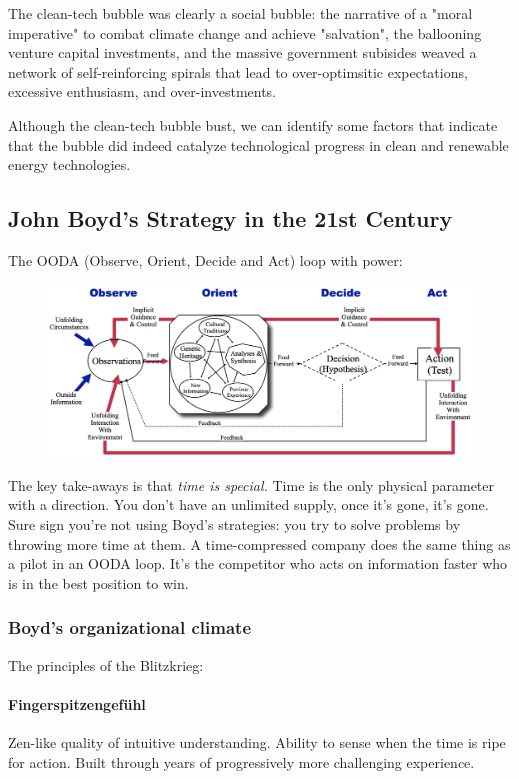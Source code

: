 \documentclass[a4paper]{extarticle}
\begin{document}
The clean-tech bubble was clearly a social bubble: the narrative of a "moral imperative" to combat climate change and achieve "salvation", the ballooning venture capital investments, and the massive government subisides weaved a network of self-reinforcing spirals that lead to over-optimsitic expectations, excessive enthusiasm, and over-investments.

Although the clean-tech bubble bust, we can identify some factors that indicate that the bubble did indeed catalyze technological progress in clean and renewable energy technologies.

\subsection{John Boyd's Strategy in the 21st Century}

The OODA (Observe, Orient, Decide and Act) loop with power:

\begin{figure}[H]
    \includegraphics[width=15cm]{../images/EnpRisk_Fig13-3}
    \centering
\end{figure}

The key take-aways is that \textit{time is special.} Time is the only physical parameter with a direction. You don't have an unlimited supply, once it's gone, it's gone. Sure sign you're not using Boyd's strategies: you try to solve problems by throwing more time at them. A time-compressed company does the same thing as a pilot in an OODA loop. It's the competitor who acts on information faster who is in the best position to win.

\subsubsection{Boyd's organizational climate}

The principles of the Blitzkrieg:

\paragraph{Fingerspitzengefühl} Zen-like quality of intuitive understanding. Ability to sense when the time is ripe for action. Built through years of progressively more challenging experience.
\end{document}
